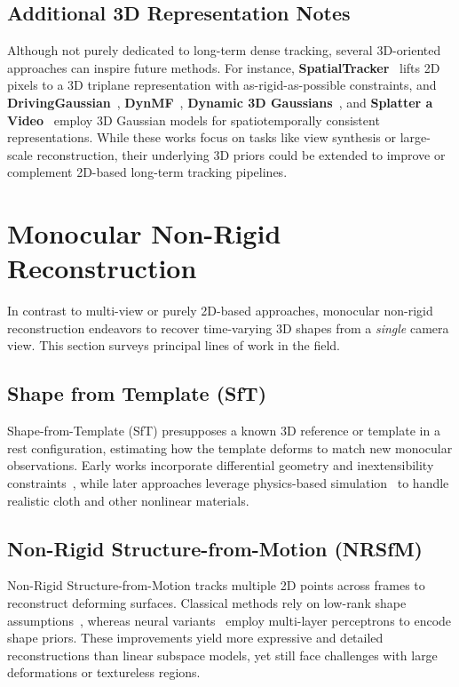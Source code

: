 \documentclass[11pt]{article}
\begin{document}
\subsection{Additional 3D Representation Notes}
Although not purely dedicated to long-term dense tracking, several 3D-oriented approaches can inspire future methods. For instance, \textbf{SpatialTracker}~\cite{xiao2024spatialtracker} lifts 2D pixels to a 3D triplane representation with as-rigid-as-possible constraints, and \textbf{DrivingGaussian}~\cite{zhou2024drivinggaussian}, \textbf{DynMF}~\cite{kratimenos2024dynmf}, \textbf{Dynamic 3D Gaussians}~\cite{luiten2024dynamic}, and \textbf{Splatter a Video}~\cite{sun2024splatter} employ 3D Gaussian models for spatiotemporally consistent representations. While these works focus on tasks like view synthesis or large-scale reconstruction, their underlying 3D priors could be extended to improve or complement 2D-based long-term tracking pipelines.

\section{Monocular Non-Rigid Reconstruction}
\label{sec:monocular_nrs}
In contrast to multi-view or purely 2D-based approaches, monocular non-rigid reconstruction endeavors to recover time-varying 3D shapes from a \emph{single} camera view. This section surveys principal lines of work in the field.

\subsection{Shape from Template (SfT)}
\label{subsec:sft}
Shape-from-Template (SfT) presupposes a known 3D reference or template in a rest configuration, estimating how the template deforms to match new monocular observations. Early works incorporate differential geometry and inextensibility constraints~\cite{bartoli2015shape, yu2015direct}, while later approaches leverage physics-based simulation~\cite{kairanda2022f} to handle realistic cloth and other nonlinear materials.

\subsection{Non-Rigid Structure-from-Motion (NRSfM)}
\label{subsec:nrsfm}
Non-Rigid Structure-from-Motion tracks multiple 2D points across frames to reconstruct deforming surfaces. Classical methods rely on low-rank shape assumptions~\cite{bregler2000recovering, dai2014simple}, whereas neural variants~\cite{sidhu2020neural} employ multi-layer perceptrons to encode shape priors. These improvements yield more expressive and detailed reconstructions than linear subspace models, yet still face challenges with large deformations or textureless regions.
\end{document}
